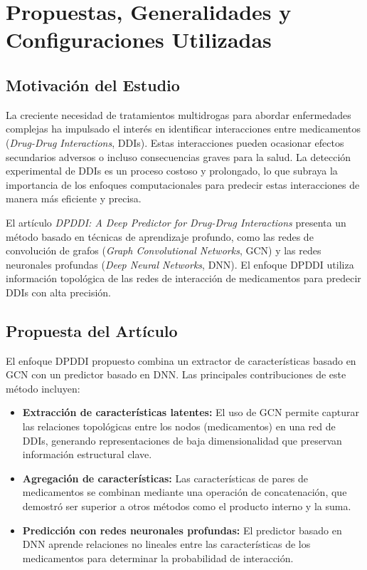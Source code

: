 \chapter{Propuestas, Generalidades y Configuraciones Utilizadas}

\section{Motivación del Estudio}

La creciente necesidad de tratamientos multidrogas para abordar enfermedades complejas ha impulsado el interés en identificar interacciones entre medicamentos (\textit{Drug-Drug Interactions}, DDIs). Estas interacciones pueden ocasionar efectos secundarios adversos o incluso consecuencias graves para la salud. La detección experimental de DDIs es un proceso costoso y prolongado, lo que subraya la importancia de los enfoques computacionales para predecir estas interacciones de manera más eficiente y precisa.

El artículo \textit{DPDDI: A Deep Predictor for Drug-Drug Interactions} presenta un método basado en técnicas de aprendizaje profundo, como las redes de convolución de grafos (\textit{Graph Convolutional Networks}, GCN) y las redes neuronales profundas (\textit{Deep Neural Networks}, DNN). El enfoque DPDDI utiliza información topológica de las redes de interacción de medicamentos para predecir DDIs con alta precisión.

\section{Propuesta del Artículo}

El enfoque DPDDI propuesto combina un extractor de características basado en GCN con un predictor basado en DNN. Las principales contribuciones de este método incluyen:

\begin{itemize}
    \item \textbf{Extracción de características latentes:} El uso de GCN permite capturar las relaciones topológicas entre los nodos (medicamentos) en una red de DDIs, generando representaciones de baja dimensionalidad que preservan información estructural clave.
    \item \textbf{Agregación de características:} Las características de pares de medicamentos se combinan mediante una operación de concatenación, que demostró ser superior a otros métodos como el producto interno y la suma.
    \item \textbf{Predicción con redes neuronales profundas:} El predictor basado en DNN aprende relaciones no lineales entre las características de los medicamentos para determinar la probabilidad de interacción.
\end{itemize}

